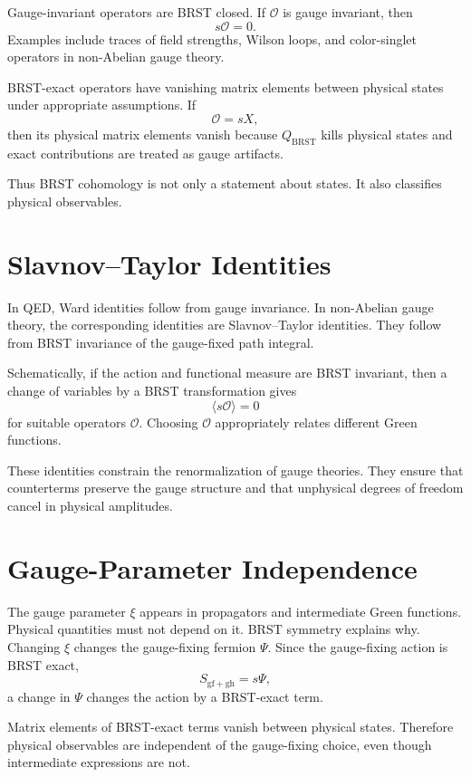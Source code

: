 Gauge-invariant operators are BRST closed. If \(\mathcal{O}\) is gauge
invariant, then
\[
    s\mathcal{O}=0.
\]
Examples include traces of field strengths, Wilson loops, and color-singlet
operators in non-Abelian gauge theory.

BRST-exact operators have vanishing matrix elements between physical states under
appropriate assumptions. If
\[
    \mathcal{O}=sX,
\]
then its physical matrix elements vanish because \(Q_{\mathrm{BRST}}\) kills
physical states and exact contributions are treated as gauge artifacts.

Thus BRST cohomology is not only a statement about states. It also classifies
physical observables.

\section{Slavnov--Taylor Identities}

In QED, Ward identities follow from gauge invariance. In non-Abelian gauge
theory, the corresponding identities are Slavnov--Taylor identities. They follow
from BRST invariance of the gauge-fixed path integral.

Schematically, if the action and functional measure are BRST invariant, then a
change of variables by a BRST transformation gives
\[
    \langle s\mathcal{O}\rangle=0
\]
for suitable operators \(\mathcal{O}\). Choosing \(\mathcal{O}\) appropriately
relates different Green functions.

These identities constrain the renormalization of gauge theories. They ensure
that counterterms preserve the gauge structure and that unphysical degrees of
freedom cancel in physical amplitudes.

\section{Gauge-Parameter Independence}

The gauge parameter \(\xi\) appears in propagators and intermediate Green
functions. Physical quantities must not depend on it. BRST symmetry explains why.
Changing \(\xi\) changes the gauge-fixing fermion \(\Psi\). Since the
gauge-fixing action is BRST exact,
\[
    S_{\mathrm{gf+gh}}=s\Psi,
\]
a change in \(\Psi\) changes the action by a BRST-exact term.

Matrix elements of BRST-exact terms vanish between physical states. Therefore
physical observables are independent of the gauge-fixing choice, even though
intermediate expressions are not.

